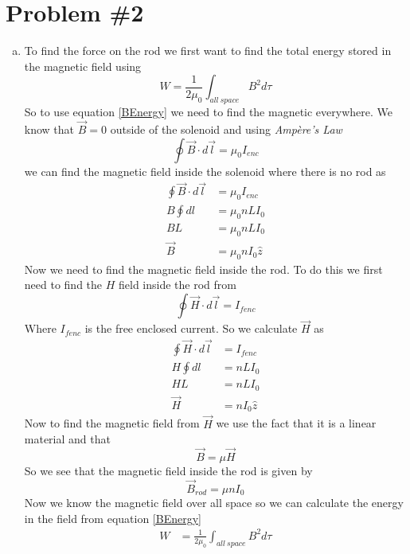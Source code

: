 \documentclass[11pt]{article}
\numberwithin{equation}{section}
\begin{document}
\section{Problem \#2}
\begin{enumerate}[(a)]
\item
To find the force on the rod we first want to find the total energy stored in the magnetic field using
\begin{equation}
W = \frac{1}{2\mu_0}\int_{all\ space}B^2d\tau
\label{BEnergy}
\end{equation}
So to use equation \ref{BEnergy} we need to find the magnetic everywhere. We know that $\vec{B} = 0$ outside of the solenoid and using \emph{Amp\`{e}re's Law}
\begin{equation}
\oint \vec{B}\cdot d\vec{l} = \mu_0 I_{enc}
\label{AmpLaw}
\end{equation}
we can find the magnetic field inside the solenoid where there is no rod as
\begin{align*}
\oint \vec{B}\cdot d\vec{l} &= \mu_0 I_{enc}\\
B\oint dl &= \mu_0 nLI_0\\
BL &= \mu_0 nLI_0\\
\vec{B} &= \mu_0 nI_0\hat{z}
\end{align*}
Now we need to find the magnetic field inside the rod. To do this we first need to find the $H$ field inside the rod from 
\begin{equation}
\oint\vec{H}\cdot d\vec{l} = I_{fenc}
\label{HAmp}
\end{equation}
Where $I_{fenc}$ is the free enclosed current. So we calculate $\vec{H}$ as
\begin{align*}
\oint\vec{H}\cdot d\vec{l} &= I_{fenc}\\
H\oint dl &= nLI_0\\
HL &= nLI_0\\
\vec{H} &= nI_0\hat{z}
\end{align*}
Now to find the magnetic field from $\vec{H}$ we use the fact that it is a linear material and that
\begin{equation}
\vec{B} = \mu\vec{H}
\label{LinH}
\end{equation}
So we see that the magnetic field inside the rod is given by
$$\vec{B}_{rod} = \mu nI_0$$
Now we know the magnetic field over all space so we can calculate the energy in the field from equation \ref{BEnergy}
\begin{align*}
W &= \frac{1}{2\mu_0}\int_{all\ space}B^2d\tau\\

\end{align*}
\end{enumerate}
\end{document}
